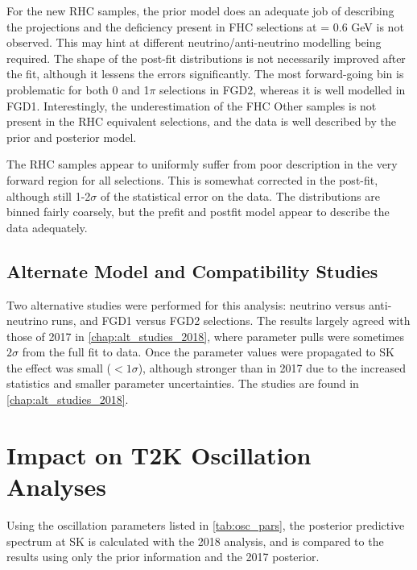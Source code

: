 For the new RHC samples, the prior model does an adequate job of describing the projections and the deficiency present in FHC selections at \pmu= 0.6 GeV is not observed. This may hint at different neutrino/anti-neutrino modelling being required. The shape of the post-fit distributions is not necessarily improved after the fit, although it lessens the errors significantly. The most forward-going bin is problematic for both 0 and 1$\pi$ selections in FGD2, whereas it is well modelled in FGD1. Interestingly, the underestimation of the FHC Other samples is not present in the RHC equivalent selections, and the data is well described by the prior and posterior model.

The \numu RHC samples appear to uniformly suffer from poor description in the very forward region for all selections. This is somewhat corrected in the post-fit, although still 1-2$\sigma$ of the statistical error on the data. The \pmu distributions are binned fairly coarsely, but the prefit and postfit model appear to describe the data adequately.

\subsection{Alternate Model and Compatibility Studies}
Two alternative studies were performed for this analysis: neutrino versus anti-neutrino runs, and FGD1 versus FGD2 selections. The results largely agreed with those of 2017 in \autoref{chap:alt_studies_2018}, where parameter pulls were sometimes $2\sigma$ from the full fit to data. Once the parameter values were propagated to SK the effect was small ($<1\sigma$), although stronger than in 2017 due to the increased statistics and smaller parameter uncertainties. The studies are found in \autoref{chap:alt_studies_2018}.

\section{Impact on T2K Oscillation Analyses}
Using the oscillation parameters listed in \autoref{tab:osc_pars}, the posterior predictive spectrum at SK is calculated with the 2018 analysis, and is compared to the results using only the prior information and the 2017 posterior.

